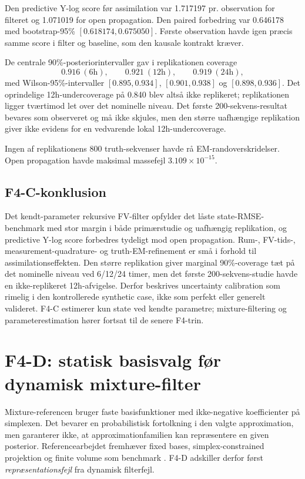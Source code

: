 Den predictive Y-log score før assimilation var 1.717197 pr. observation for
filteret og 1.071019 for open propagation. Den paired forbedring var 0.646178
med bootstrap-95\% \([0.618174,0.675050]\). Første observation havde igen
præcis samme score i filter og baseline, som den kausale kontrakt kræver.

De centrale 90\%-posteriorintervaller gav i replikationen coverage
\[
 0.916\ (6\text{h}),\qquad 0.921\ (12\text{h}),\qquad 0.919\ (24\text{h}),
\]
med Wilson-95\%-intervaller \([0.895,0.934]\), \([0.901,0.938]\) og
\([0.898,0.936]\). Det oprindelige 12h-undercoverage på 0.840 blev altså ikke
replikeret; replikationen ligger tværtimod let over det nominelle niveau.
Det første 200-sekvens-resultat bevares som observeret og må ikke skjules, men
den større uafhængige replikation giver ikke evidens for en vedvarende lokal
12h-undercoverage.

Ingen af replikationens 800 truth-sekvenser havde rå EM-randoverskridelser.
Open propagation havde maksimal massefejl \(3.109\times10^{-15}\).

\subsection{F4-C-konklusion}
Det kendt-parameter rekursive FV-filter opfylder det låste state-RMSE-benchmark
med stor margin i både primærstudie og uafhængig replikation, og predictive
Y-log score forbedres tydeligt mod open propagation. Rum-, FV-tids-,
measurement-quadrature- og truth-EM-refinement er små i forhold til
assimilationseffekten. Den større replikation giver marginal 90\%-coverage tæt
på det nominelle niveau ved 6/12/24 timer, men det første 200-sekvens-studie
havde en ikke-replikeret 12h-afvigelse. Derfor beskrives uncertainty calibration
som rimelig i den kontrollerede synthetic case, ikke som perfekt eller generelt
valideret. F4-C estimerer kun state ved kendte parametre; mixture-filtering og
parameterestimation hører fortsat til de senere F4-trin.

\section{F4-D: statisk basisvalg før dynamisk mixture-filter}
\label{sec:f4d_static}

Mixture-referencen bruger faste basisfunktioner med ikke-negative koefficienter på
simplexen. Det bevarer en probabilistisk fortolkning i den valgte approximation,
men garanterer ikke, at approximationfamilien kan repræsentere en given posterior.
Referencearbejdet fremhæver fixed bases, simplex-constrained projektion og finite
volume som benchmark \cite{nielsen}. F4-D adskiller derfor først
\emph{repræsentationsfejl} fra dynamisk filterfejl.

